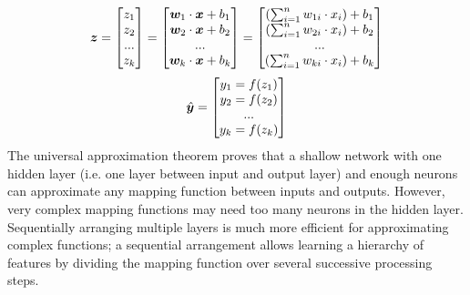 \begin{align}\eqlbl{nn4}%
		\boldsymbol{z} = \begin{bmatrix}
			z_1\\
			z_2\\
			...\\
			z_k\\
		\end{bmatrix} = \begin{bmatrix}
			\boldsymbol{w}_1 \cdot \boldsymbol{x} + b_1\\
			\boldsymbol{w}_2 \cdot \boldsymbol{x} + b_2\\
			...\\
			\boldsymbol{w}_k \cdot \boldsymbol{x} + b_k\\
		\end{bmatrix} = \begin{bmatrix}
			\left( \sum_{i=1}^{n}w_{1i} \cdot x_i \right) + b_1\\
			\left( \sum_{i=1}^{n}w_{2i} \cdot x_i \right) + b_2\\
			...\\
			\left( \sum_{i=1}^{n}w_{ki} \cdot x_i \right) + b_k\\
		\end{bmatrix}
\end{align}
\begin{align}\eqlbl{nn5}%
		\hat{\boldsymbol{y}} = \begin{bmatrix}
			y_1 = f(z_1)\\
			y_2 = f(z_2)\\
			...\\
			y_k = f(z_k)\\
		\end{bmatrix}
\end{align}
%
The universal approximation theorem proves that a shallow network with one hidden layer (i.e. one layer between input and output layer) and enough neurons can approximate any mapping function between inputs and outputs.
However, very complex mapping functions may need too many neurons in the hidden layer.
Sequentially arranging multiple layers is much more efficient for approximating complex functions;
a sequential arrangement allows learning a hierarchy of features by dividing the mapping function over several successive processing steps.

